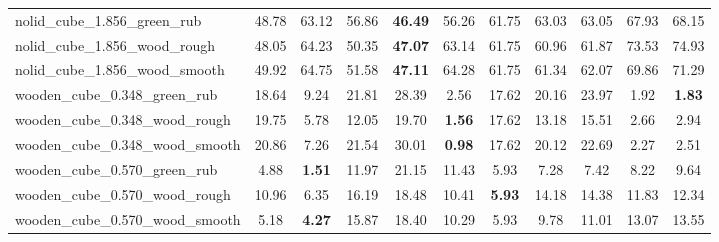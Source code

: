 \begin{table}[H]
{\begin{tabular}{l cccccccccc}
        nolid\_cube\_1.856\_green\_rub & 48.78 & 63.12 & 56.86 & \textbf{46.49} & 56.26 & 61.75 & 63.03 & 63.05 & 67.93 & 68.15 \\
        nolid\_cube\_1.856\_wood\_rough & 48.05 & 64.23 & 50.35 & \textbf{47.07} & 63.14 & 61.75 & 60.96 & 61.87 & 73.53 & 74.93 \\
        nolid\_cube\_1.856\_wood\_smooth & 49.92 & 64.75 & 51.58 & \textbf{47.11} & 64.28 & 61.75 & 61.34 & 62.07 & 69.86 & 71.29 \\
        wooden\_cube\_0.348\_green\_rub & 18.64 & 9.24 & 21.81 & 28.39 & 2.56 & 17.62 & 20.16 & 23.97 & 1.92 & \textbf{1.83} \\
        wooden\_cube\_0.348\_wood\_rough & 19.75 & 5.78 & 12.05 & 19.70 & \textbf{1.56} & 17.62 & 13.18 & 15.51 & 2.66 & 2.94 \\
        wooden\_cube\_0.348\_wood\_smooth & 20.86 & 7.26 & 21.54 & 30.01 & \textbf{0.98} & 17.62 & 20.12 & 22.69 & 2.27 & 2.51 \\
        wooden\_cube\_0.570\_green\_rub & 4.88 & \textbf{1.51} & 11.97 & 21.15 & 11.43 & 5.93 & 7.28 & 7.42 & 8.22 & 9.64 \\
        wooden\_cube\_0.570\_wood\_rough & 10.96 & 6.35 & 16.19 & 18.48 & 10.41 & \textbf{5.93} & 14.18 & 14.38 & 11.83 & 12.34 \\
        wooden\_cube\_0.570\_wood\_smooth & 5.18 & \textbf{4.27} & 15.87 & 18.40 & 10.29 & 5.93 & 9.78 & 11.01 & 13.07 & 13.55 \\
        \bottomrule
    \end{tabular}
    }
\end{table}
